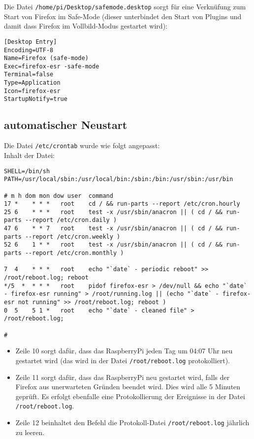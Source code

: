 Die Datei \lstinline|/home/pi/Desktop/safemode.desktop| sorgt für eine Verknüfung zum Start von Firefox im Safe-Mode (dieser unterbindet den Start von Plugins und damit dass Firefox im Vollbild-Modus gestartet wird):\\
\begin{lstlisting}
[Desktop Entry]
Encoding=UTF-8
Name=Firefox (safe-mode)
Exec=firefox-esr -safe-mode
Terminal=false
Type=Application
Icon=firefox-esr
StartupNotify=true
\end{lstlisting}

\subsection{automatischer Neustart}
\label{sec:rebootconf}
Die Datei \lstinline|/etc/crontab| wurde wie folgt angepasst:\\
Inhalt der Datei:
\begin{lstlisting}
SHELL=/bin/sh
PATH=/usr/local/sbin:/usr/local/bin:/sbin:/bin:/usr/sbin:/usr/bin

# m h dom mon dow user	command
17 *	* * *	root    cd / && run-parts --report /etc/cron.hourly
25 6	* * *	root	test -x /usr/sbin/anacron || ( cd / && run-parts --report /etc/cron.daily )
47 6	* * 7	root	test -x /usr/sbin/anacron || ( cd / && run-parts --report /etc/cron.weekly )
52 6	1 * *	root	test -x /usr/sbin/anacron || ( cd / && run-parts --report /etc/cron.monthly )

7  4	* * *	root	echo "`date` - periodic reboot" >> /root/reboot.log; reboot 
*/5  *	* * *	root	pidof firefox-esr > /dev/null && echo "`date` - firefox-esr running" > /root/running.log || (echo "`date` - firefox-esr not running" >> /root/reboot.log; reboot )
0  5	5 1 *	root	echo "`date` - cleaned file" > /root/reboot.log;

#
\end{lstlisting}
\begin{itemize}
	\item {Zeile 10 sorgt dafür, dass das RaspberryPi jeden Tag um 04:07 Uhr neu gestartet wird (das wird in der Datei \lstinline|/root/reboot.log| protokolliert).}
	\item {Zeile 11 sorgt dafür, dass das RaspberryPi neu gestartet wird, falls der Firefox aus unerwarteten Gründen beendet wird. Dies wird alle 5 Minuten geprüft.
		Es erfolgt ebenfalle eine Protokollierung der Ereignisse in der Datei \lstinline|/root/reboot.log|.}
	\item {Zeile 12 beinhaltet den Befehl die Protokoll-Datei \lstinline|/root/reboot.log| jährlich zu leeren.}
\end{itemize}

